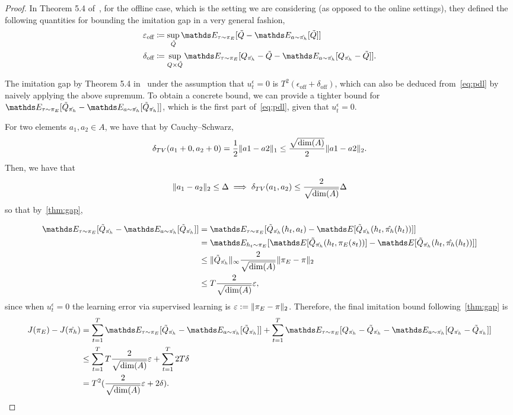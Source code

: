 \begin{proof}
In Theorem 5.4 of~\citet{Swamy2022}, for the offline case, which is the setting we are considering (as opposed to the online settings), they defined the following quantities for bounding the imitation gap in a very general fashion,
\begin{align*}
\epsilon_{\text{off}}&\coloneqq\sup_{\tilde{Q}}\expectE_{\tau\sim\pi_E}[\tilde{Q}-\expectE_{a\sim\hat{\pi_h}}[\tilde{Q}]]\\
\delta_{\text{off}}&\coloneqq\sup_{Q\times\tilde{Q}}\expectE_{\tau\sim\pi_E}[Q_{\hat{\pi_h}}-\tilde{Q}-\expectE_{a\sim\hat{\pi_h}}[Q_{\hat{\pi_h}}-\tilde{Q}]].
\end{align*}

The imitation gap by Theorem 5.4 in~\citet{Swamy2022} under the assumption that $u^\epsilon_t=0$ is $T^2(\epsilon_{\text{off}}+\delta_{\text{off}})$, which can also be deduced from~\cref{eq:pdl} by naively applying the above supremum. To obtain a concrete bound, we can provide a tighter bound for $\expectE_{\tau\sim \pi_E}[\tilde{Q}_{\hat{\pi_h}}-\expectE_{a\sim\hat{\pi_h}}[\tilde{Q}_{\hat{\pi_h}}]]$, which is the first part of~\cref{eq:pdl}, given that $u^\epsilon_t=0$.


For two elements $a_1,a_2\in A$, we have that by Cauchy–Schwarz,
\begin{align*}
\delta_{TV}(a_1+0,a_2+0)=\frac{1}{2}\lVert a1-a2\rVert_1\leq\frac{\sqrt{\dim(A)}}{2}\lVert a1-a2\rVert_2.
\end{align*}
Then, we have that
\begin{align*}
\lVert a_1-a_2\rVert_2\leq\Delta \implies \delta_{TV}(a_1,a_2)\leq \frac{2}{\sqrt{\dim(A)}}\Delta
\end{align*}
so that by~\cref{thm:gap},

\begin{align}
\expectE_{\tau\sim \pi_E}[\tilde{Q}_{\hat{\pi_h}}-\expectE_{a\sim\hat{\pi_h}}[\tilde{Q}_{\hat{\pi_h}}]]&=\expectE_{\tau\sim \pi_E}[\tilde{Q}_{\hat{\pi_h}}(h_t,a_t)-\expectE[\tilde{Q}_{\hat{\pi_h}}(h_t,\hat{\pi_h}(h_t))]]\\
&=\expectE_{h_t\sim \pi_E}[\expectE[\tilde{Q}_{\hat{\pi_h}}(h_t,\pi_E(s_t))]-\expectE[\tilde{Q}_{\hat{\pi_h}}(h_t,\hat{\pi_h}(h_t))]]\\
&\leq \norm{\tilde{Q}_{\hat{\pi_h}}}_\infty \frac{2}{\sqrt{\dim(A)}}\norm{\pi_E-\pi}_2\\
&\leq T \frac{2}{\sqrt{\dim(A)}}\epsilon,
\end{align}
since when $u^\epsilon_t=0$ the learning error via supervised learning is $\varepsilon:=\lVert\pi_E-\pi\rVert_2$. Therefore, the final imitation bound following~\cref{thm:gap} is
\begin{align}
   J(\pi_E)-J(\hat{\pi_h})&=\sum_{t=1}^T \expectE_{\tau\sim\pi_E}[\tilde{Q}_{\hat{\pi_h}}-\expectE_{a\sim\hat{\pi_h}}[\tilde{Q}_{\hat{\pi_h}}]]+\sum_{t=1}^T \expectE_{\tau\sim\pi_E}[Q_{\hat{\pi_h}}-\tilde{Q}_{\hat{\pi_h}}-\expectE_{a\sim\hat{\pi_h}}[Q_{\hat{\pi_h}}-\tilde{Q}_{\hat{\pi_h}}]]\\
    &\leq\sum_{t=1}^T T\frac{2}{\sqrt{\dim(A)}}\epsilon+\sum_{t=1}^T 2T\delta\\
   &= T^2(\frac{2}{\sqrt{\dim(A)}}\epsilon+2\delta).
\end{align}


\end{proof}

